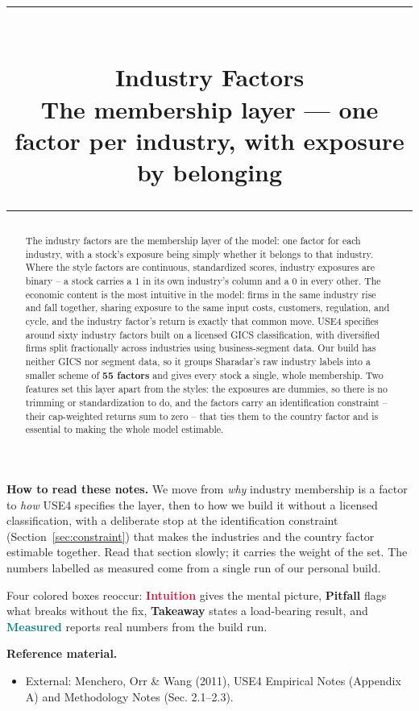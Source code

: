 \documentclass[11pt]{article}
\title{\vspace{-2.2em}
  {\color{steel}\rule{\textwidth}{1.3pt}}\\[0.7em]
  \Huge\bfseries Industry Factors\\[0.35em]
  \large\mdseries The membership layer --- one factor per industry, with exposure by belonging\\[0.4em]
  {\color{steel}\rule{\textwidth}{0.7pt}}}
\author{}
\date{}
\theoremstyle{definition}
\theoremstyle{plain}
\theoremstyle{remark}
\begin{document}
\maketitle
\thispagestyle{empty}

\begin{abstract}
The industry factors are the membership layer of the model: one factor for each industry, with a stock's exposure being simply whether it belongs to that industry. Where the style factors are continuous, standardized scores, industry exposures are binary -- a stock carries a $1$ in its own industry's column and a $0$ in every other. The economic content is the most intuitive in the model: firms in the same industry rise and fall together, sharing exposure to the same input costs, customers, regulation, and cycle, and the industry factor's return is exactly that common move. USE4 specifies around sixty industry factors built on a licensed GICS classification, with diversified firms split fractionally across industries using business-segment data. Our build has neither GICS nor segment data, so it groups Sharadar's raw industry labels into a smaller scheme of \textbf{55 factors} and gives every stock a single, whole membership. Two features set this layer apart from the styles: the exposures are dummies, so there is no trimming or standardization to do, and the factors carry an identification constraint -- their cap-weighted returns sum to zero -- that ties them to the country factor and is essential to making the whole model estimable.
\end{abstract}

\begin{tcolorbox}[colback=paperlt,colframe=ink!30,boxrule=0.4pt,arc=2pt,left=10pt,right=10pt,top=8pt,bottom=8pt]
\textbf{How to read these notes.} We move from \emph{why} industry membership is a factor to \emph{how} USE4 specifies the layer, then to how we build it without a licensed classification, with a deliberate stop at the identification constraint (Section~\ref{sec:constraint}) that makes the industries and the country factor estimable together. Read that section slowly; it carries the weight of the set. The numbers labelled as measured come from a single run of our personal build.

\smallskip
Four colored boxes reoccur: \textcolor{crimson}{\textbf{Intuition}} gives the mental picture, \textcolor{amber}{\textbf{Pitfall}} flags what breaks without the fix, \textcolor{steel}{\textbf{Takeaway}} states a load-bearing result, and \textcolor{teal}{\textbf{Measured}} reports real numbers from the build run.

\smallskip
\textbf{Reference material.}
\begin{itemize}[leftmargin=1.4em,topsep=2pt]
  \item External: Menchero, Orr \& Wang (2011), USE4 Empirical Notes (Appendix A) and Methodology Notes (Sec. 2.1--2.3).
\end{itemize}
\end{tcolorbox}
\end{document}
